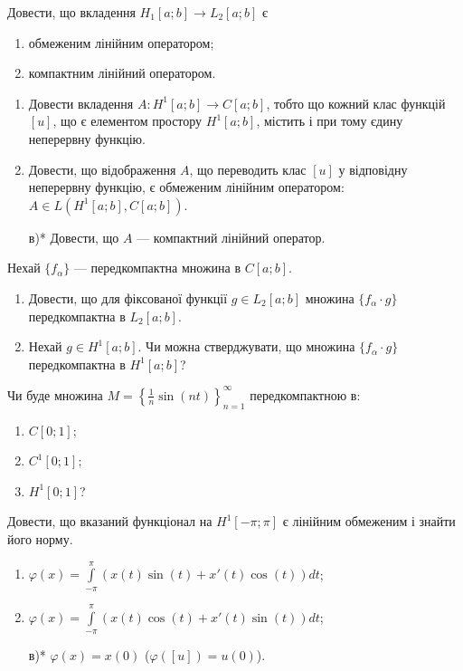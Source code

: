 \begin{exercise}
    Довести, що вкладення $H_1[a;b] \to L_2[a;b]$ є
    \begin{enumerate}
        \item обмеженим лінійним оператором;
        \item компактним лінійний оператором.
    \end{enumerate}
\end{exercise}

\begin{exercise}
    \begin{enumerate}
        \item Довести вкладення $A: H^1[a;b] \to C[a;b]$, тобто що кожний
        клас функцій $[u]$, що є елементом простору $H^1[a;b]$, містить і при тому
        єдину неперервну функцію.
        \item Довести, що відображення $A$, що переводить клас $[u]$
        у відповідну неперервну функцію, є обмеженим лінійним оператором:
        $A \in L(H^1[a;b], C[a;b])$.
        \item[в)*] Довести, що $A$ --- компактний лінійний оператор. 
    \end{enumerate}
\end{exercise}

\begin{exercise}
    Нехай $\{ f_\alpha\}$ --- передкомпактна множина в $C[a;b]$.
    \begin{enumerate}
        \item Довести, що для фіксованої функції $g \in L_2[a;b]$
        множина $\{ f_\alpha \cdot g\}$ передкомпактна в $L_2[a;b]$.
        \item Нехай $g \in H^1[a;b]$. Чи можна стверджувати, що множина
        $\{ f_\alpha \cdot g\}$ передкомпактна в $H^1[a;b]$?
    \end{enumerate}
\end{exercise}

\begin{exercise}
    Чи буде множина $M = \left\{ \frac{1}{n} \sin{(nt)}\right\}_{n=1}^{\infty}$
    передкомпактною в:
    \begin{enumerate}
        \item $C[0;1]$;
        \item $C^1[0;1]$;
        \item $H^1[0;1]$?
    \end{enumerate}
\end{exercise}

\begin{exercise}
    Довести, що вказаний функціонал на $H^1[-\pi; \pi]$
    є лінійним обмеженим і знайти його норму.
    \begin{enumerate}
        \item $\varphi(x) = \int\limits_{-\pi}^{\pi} (x(t) \sin(t) + x'(t) \cos(t)) dt$;
        \item $\varphi(x) = \int\limits_{-\pi}^{\pi} (x(t) \cos(t) + x'(t) \sin(t)) dt$;
        \item[в)*] $\varphi(x) = x(0)$ ($\varphi([u]) = u(0)$).
    \end{enumerate}
\end{exercise}

